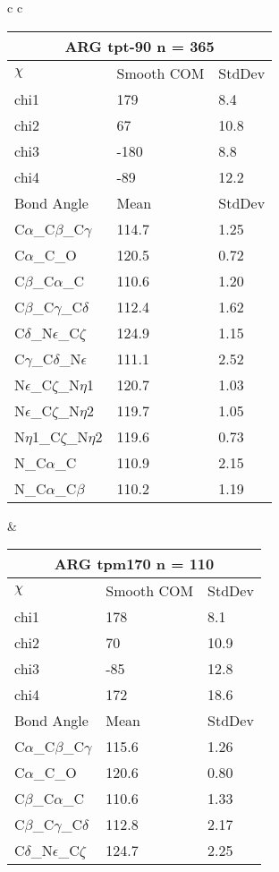 \begin{longtable}{ c c }
  \begin{tabular}{ l l l }
  \toprule
  \multicolumn{3}{c}{ARG \textbf{tpt-90} n = 365} \\ \toprule
  $\chi$       & Smooth COM & StdDev \\ \midrule
  chi1 & 179 & 8.4 \\ 
  chi2 & 67 & 10.8 \\ 
  chi3 & -180 & 8.8 \\ 
  chi4 & -89 & 12.2 \\ \midrule
  Bond Angle   & Mean     & StdDev \\ \midrule
  C$\alpha$\_C$\beta$\_C$\gamma$ & 114.7 & 1.25\\
  C$\alpha$\_C\_O & 120.5 & 0.72\\
  C$\beta$\_C$\alpha$\_C & 110.6 & 1.20\\
  C$\beta$\_C$\gamma$\_C$\delta$ & 112.4 & 1.62\\
  C$\delta$\_N$\epsilon$\_C$\zeta$ & 124.9 & 1.15\\
  C$\gamma$\_C$\delta$\_N$\epsilon$ & 111.1 & 2.52\\
  N$\epsilon$\_C$\zeta$\_N$\eta$1 & 120.7 & 1.03\\
  N$\epsilon$\_C$\zeta$\_N$\eta$2 & 119.7 & 1.05\\
  N$\eta$1\_C$\zeta$\_N$\eta$2 & 119.6 & 0.73\\
  N\_C$\alpha$\_C & 110.9 & 2.15\\
  N\_C$\alpha$\_C$\beta$ & 110.2 & 1.19\\
  \bottomrule
  \end{tabular}
  &
  \begin{tabular}{ l l l }
  \toprule
  \multicolumn{3}{c}{ARG \textbf{tpm170} n = 110} \\ \toprule
  $\chi$       & Smooth COM & StdDev \\ \midrule
  chi1 & 178 & 8.1 \\ 
  chi2 & 70 & 10.9 \\ 
  chi3 & -85 & 12.8 \\ 
  chi4 & 172 & 18.6 \\ \midrule
  Bond Angle   & Mean     & StdDev \\ \midrule
  C$\alpha$\_C$\beta$\_C$\gamma$ & 115.6 & 1.26\\
  C$\alpha$\_C\_O & 120.6 & 0.80\\
  C$\beta$\_C$\alpha$\_C & 110.6 & 1.33\\
  C$\beta$\_C$\gamma$\_C$\delta$ & 112.8 & 2.17\\
  C$\delta$\_N$\epsilon$\_C$\zeta$ & 124.7 & 2.25\\

\end{tabular}
\end{longtable}
